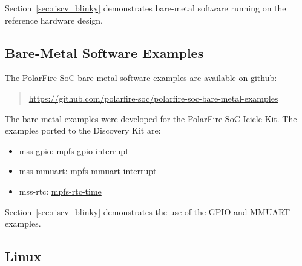 Section~\ref{sec:riscv_blinky} demonstrates bare-metal software running on the
reference hardware design.

\vskip10mm
\begin{center}
\end{center}
\vskip10mm

\subsection{Bare-Metal Software Examples}

The PolarFire SoC bare-metal software examples are available on github:
%
\begin{quote}
\href{https://github.com/polarfire-soc/polarfire-soc-bare-metal-examples}
{https://github.com/polarfire-soc/polarfire-soc-bare-metal-examples}
\end{quote}
%
The bare-metal examples were developed for the PolarFire SoC Icicle Kit.
%
The examples ported to the Discovery Kit are:
%
\begin{itemize}
\item mss-gpio: \href{https://github.com/polarfire-soc/polarfire-soc-bare-metal-examples/blob/main/driver-examples/mss/mss-gpio/mpfs-gpio-interrupt}{mpfs-gpio-interrupt}
\item mss-mmuart: \href{https://github.com/polarfire-soc/polarfire-soc-bare-metal-examples/blob/main/driver-examples/mss/mss-mmuart/mpfs-mmuart-interrupt}{mpfs-mmuart-interrupt}
\item mss-rtc: \href{https://github.com/polarfire-soc/polarfire-soc-bare-metal-examples/blob/main/driver-examples/mss/mss-rtc/mpfs-rtc-time}{mpfs-rtc-time}
\end{itemize}
%
Section~\ref{sec:riscv_blinky} demonstrates the use of the GPIO and MMUART
examples.

\clearpage
\subsection{Linux}

